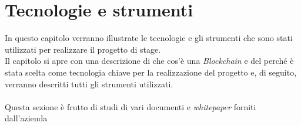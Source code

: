 
\chapter{Tecnologie e strumenti}
\label{cap:tecnologie_e_strumenti}
In questo capitolo verranno illustrate le tecnologie e gli strumenti che sono stati utilizzati per realizzare il progetto di stage.\\
Il capitolo si apre con una descrizione di che cos'è una \textit{Blockchain} e del perché è stata scelta come tecnologia chiave per la realizzazione del progetto e, di seguito, verranno descritti tutti gli strumenti utilizzati.\\\\
Questa sezione è frutto di studi di vari documenti e \textit{whitepaper} forniti dall'azienda \cite{spidchain_whitepaper, SSID, jolocom_whitepaper, ITF_gartner, hashgraph_whitepaper}
